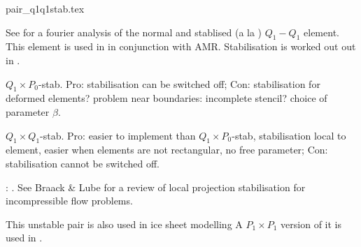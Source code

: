 \begin{flushright} {\tiny {\color{gray} pair\_q1q1stab.tex}} \end{flushright}

\begin{minipage}[t]{0.5\textwidth}

\end{minipage}
\begin{minipage}[t]{0.5\textwidth}

\end{minipage}

See \cite{nosi01} for a fourier analysis of the normal and stablised (a la \cite{hufb86}) $Q_1-Q_1$ element.
This element is used in \cite{bugs09,busa13} in conjunction with AMR. 
Stabilisation is worked out out in \cite{dobo04,bodg06,bodo06}.

$Q_1\times P_0$-stab. Pro: stabilisation can be switched off; Con: stabilisation for deformed elements? 
problem near boundaries: incomplete stencil? choice of parameter $\beta$.

$Q_1\times Q_1$-stab. Pro: easier to implement than $Q_1\times P_0$-stab, stabilisation local to element, easier when elements are not rectangular, no free parameter; Con: stabilisation cannot be switched off.

\Literature: \cite{shry78,temr92,tezd92,grcc95,idsn95,knto00,fros07,lihc09}. See Braack \& Lube \cite{brlu09}
for a review of local projection stabilisation for incompressible flow problems. 

This unstable pair is also used in ice sheet modelling \cite{heah18,zhjg11,zwgg07}
A $P_1\times P_1$ version of it is used in \cite{kahp20}.
